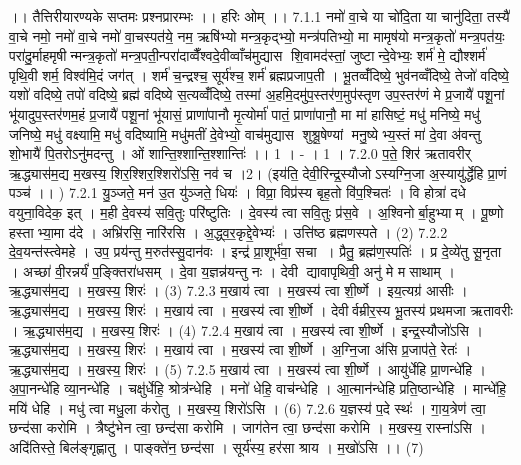\setcounter{anuvakam}{0}
।। तैत्तिरीयारण्यके सप्तमः प्रश्नप्रारम्भः ।। हरिः ओम् ।।
7.1.1
नमो॑ वा॒चे या चो॑दि॒ता या चानु॑दिता॒ तस्यै॑ वा॒चे नमो॒ नमो॑ वा॒चे नमो॑ वा॒चस्पत॑ये॒ नम॒ ऋषि॑भ्यो मन्त्र॒कृद्भ्यो॒ मन्त्र॑पतिभ्यो॒ मा मामृष॑यो मन्त्र॒कृतो॑ मन्त्र॒पत॑यः॒ परा॑दु॒र्माहमृषीन्मन्त्र॒कृतो॑ मन्त्र॒पती॒न्परा॑दाव्वैँश्वदे॒वीव्वाँच॑मुद्यास शि॒वामद॑स्तां॒ जुष्टान्दे॒वेभ्यः॒ शर्म॑ मे॒ द्यौश्शर्म॑ पृथि॒वी शर्म॒ विश्व॑मि॒दं जग॑त् । शर्म॑ च॒न्द्रश्च॒ सूर्य॑श्च॒ शर्म॑ ब्रह्मप्रजाप॒ती । भू॒तव्वँ॑दिष्ये॒ भुव॑नव्वँदिष्ये॒ तेजो॑ वदिष्ये॒ यशो॑ वदिष्ये॒ तपो॑ वदिष्ये॒ ब्रह्म॑ वदिष्ये स॒त्यव्वँ॑दिष्ये॒ तस्मा॑ अ॒हमि॒दमु॑प॒स्तर॑ण॒मुप॑स्तृण उप॒स्तर॑णं मे प्र॒जायै॑ पशू॒नां भू॑यादुप॒स्तर॑णम॒हं प्र॒जायै॑ पशू॒नां भू॑यासं॒ प्राणा॑पानौ मृ॒त्योर्मा॑ पातं॒ प्राणा॑पानौ॒ मा मा॑ हासिष्टं॒ मधु॑ मनिष्ये॒ मधु॑ जनिष्ये॒ मधु॑ वक्ष्यामि॒ मधु॑ वदिष्यामि॒ मधु॑मतीं दे॒वेभ्यो॒ वाच॑मुद्यास शुश्रू॒षेण्यां मनु॒ष्येभ्य॒स्तं मा॑ दे॒वा अ॑वन्तु शो॒भायै॑ पि॒तरोऽनु॑मदन्तु । ओं शान्ति॒श्शान्ति॒श्शान्तिः॑ ।। 1 । - । 1 ।
7.2.0
प॒ते॒ शिर॑ ऋतावरीर् ऋ॒द्ध्यास॑म॒द्य म॒खस्य॒ शिर॒श्शिर॒श्शिरो॑ऽसि॒ नव॑ च ।2। (इय॑ति॒ देवी॒रिन्द्र॒स्यौजोऽस्यग्नि॒जा अ॒स्यायु॑र्द्धेहि प्रा॒णं पञ्च॑ ।। )
7.2.1
यु॒ञ्जते॒ मन॑ उ॒त यु॑ञ्जते॒ धियः॑ । विप्रा॒ विप्र॑स्य बृह॒तो वि॑प॒श्चितः॑ । वि होत्रा॑ दधे वयुना॒विदेक॒ इत् । म॒ही दे॒वस्य॑ सवि॒तुः परि॑ष्टुतिः । दे॒वस्य॑ त्वा सवि॒तुः प्र॑स॒वे । अ॒श्विनोर्बा॒हुभ्याम् । पू॒ष्णो हस्ताभ्या॒मा द॑दे । अभ्रि॑रसि॒ नारि॑रसि । अ॒द्ध्व॒र॒कृद्दे॒वेभ्यः॑ । उत्ति॑ष्ठ ब्रह्मणस्पते । (2)
7.2.2
दे॒व॒यन्त॑स्त्वेमहे । उप॒ प्रय॑न्तु म॒रुत॑स्सु॒दान॑वः । इन्द्र॑ प्रा॒शूर्भ॑वा॒ सचा । प्रैतु॒ ब्रह्म॑ण॒स्पतिः॑ । प्र दे॒व्ये॑तु सू॒नृता । अच्छा॑ वी॒रन्नर्यं॑ प॒ङ्क्तिरा॑धसम् । दे॒वा य॒ज्ञन्न॑यन्तु नः । देवी द्यावापृथिवी॒ अनु॑ मे मसाथाम् । ऋ॒द्ध्यास॑म॒द्य । म॒खस्य॒ शिरः॑ । (3)
7.2.3
म॒खाय॑ त्वा । म॒खस्य॑ त्वा शी॒र्ष्णे । इय॒त्यग्र॑ आसीः । ऋ॒द्ध्यास॑म॒द्य । म॒खस्य॒ शिरः॑ । म॒खाय॑ त्वा । म॒खस्य॑ त्वा शी॒र्ष्णे । देवीर्वम्रीर॒स्य भू॒तस्य॑ प्रथमजा ऋतावरीः । ऋ॒द्ध्यास॑म॒द्य । म॒खस्य॒ शिरः॑ । (4)
7.2.4
म॒खाय॑ त्वा । म॒खस्य॑ त्वा शी॒र्ष्णे । इन्द्र॒स्यौजो॑ऽसि । ऋ॒द्ध्यास॑म॒द्य । म॒खस्य॒ शिरः॑ । म॒खाय॑ त्वा । म॒खस्य॑ त्वा शी॒र्ष्णे । अ॒ग्नि॒जा अ॑सि प्र॒जाप॑ते॒ रेतः॑ । ऋ॒द्ध्यास॑म॒द्य । म॒खस्य॒ शिरः॑ । (5)
7.2.5
म॒खाय॑ त्वा । म॒खस्य॑ त्वा शी॒र्ष्णे । आयु॑र्धेहि प्रा॒णन्धे॑हि । अ॒पा॒नन्धे॑हि व्या॒नन्धे॑हि । चक्षु॑र्धेहि॒ श्रोत्र॑न्धेहि । मनो॑ धेहि॒ वाच॑न्धेहि । आ॒त्मान॑न्धेहि प्रति॒ष्ठान्धे॑हि । मान्धे॑हि॒ मयि॑ धेहि । मधु॑ त्वा मधु॒ला क॑रोतु । म॒खस्य॒ शिरो॑ऽसि । (6)
7.2.6
य॒ज्ञस्य॑ प॒दे स्थः॑ । गा॒य॒त्रेण॑ त्वा॒ छन्द॑सा करोमि । त्रैष्टु॑भेन त्वा॒ छन्द॑सा करोमि । जाग॑तेन त्वा॒ छन्द॑सा करोमि । म॒खस्य॒ रास्ना॑ऽसि । अदि॑तिस्ते॒ बिल॑ङ्गृह्णातु । पाङ्क्ते॑न॒ छन्द॑सा । सूर्य॑स्य॒ हर॑सा श्राय । म॒खो॑ऽसि ।। (7)
